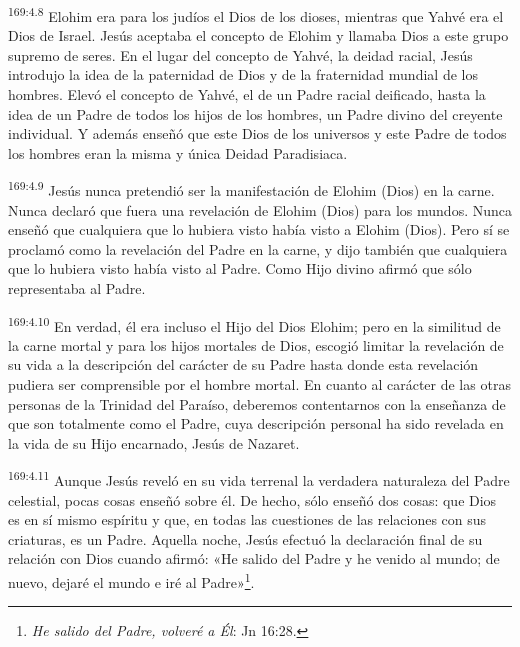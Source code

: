 \par
\textsuperscript{169:4.8} Elohim era para los judíos el Dios de los dioses, mientras que Yahvé era el Dios de Israel. Jesús aceptaba el concepto de Elohim y llamaba Dios a este grupo supremo de seres. En el lugar del concepto de Yahvé, la deidad racial, Jesús introdujo la idea de la paternidad de Dios y de la fraternidad mundial de los hombres. Elevó el concepto de Yahvé, el de un Padre racial deificado, hasta la idea de un Padre de todos los hijos de los hombres, un Padre divino del creyente individual. Y además enseñó que este Dios de los universos y este Padre de todos los hombres eran la misma y única Deidad Paradisiaca.

\par
\textsuperscript{169:4.9} Jesús nunca pretendió ser la manifestación de Elohim (Dios) en la carne. Nunca declaró que fuera una revelación de Elohim (Dios) para los mundos. Nunca enseñó que cualquiera que lo hubiera visto había visto a Elohim (Dios). Pero sí se proclamó como la revelación del Padre en la carne, y dijo también que cualquiera que lo hubiera visto había visto al Padre. Como Hijo divino afirmó que sólo representaba al Padre.

\par
\textsuperscript{169:4.10} En verdad, él era incluso el Hijo del Dios Elohim; pero en la similitud de la carne mortal y para los hijos mortales de Dios, escogió limitar la revelación de su vida a la descripción del carácter de su Padre hasta donde esta revelación pudiera ser comprensible por el hombre mortal. En cuanto al carácter de las otras personas de la Trinidad del Paraíso, deberemos contentarnos con la enseñanza de que son totalmente como el Padre, cuya descripción personal ha sido revelada en la vida de su Hijo encarnado, Jesús de Nazaret.

\par
\textsuperscript{169:4.11} Aunque Jesús reveló en su vida terrenal la verdadera naturaleza del Padre celestial, pocas cosas enseñó sobre él. De hecho, sólo enseñó dos cosas: que Dios es en sí mismo espíritu y que, en todas las cuestiones de las relaciones con sus criaturas, es un Padre. Aquella noche, Jesús efectuó la declaración final de su relación con Dios cuando afirmó: «He salido del Padre y he venido al mundo; de nuevo, dejaré el mundo e iré al Padre»\footnote{\textit{He salido del Padre, volveré a Él}: Jn 16:28.}.

